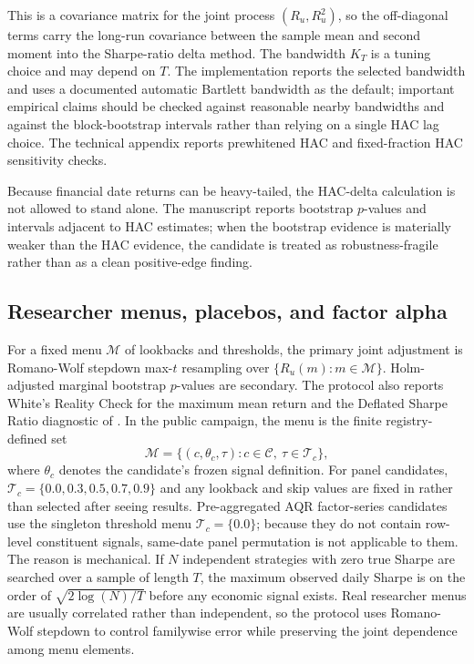 \documentclass[12pt,a4paper]{article}
\begin{document}
This is a covariance matrix for the joint process
\((R_u,R_u^2)\), so the off-diagonal terms carry the
long-run covariance between the sample mean and second moment into the
Sharpe-ratio delta method.
The bandwidth \(K_T\) is a tuning choice and may depend on \(T\).  The
implementation reports the
selected bandwidth and uses a documented automatic Bartlett bandwidth as
the default; important empirical claims should be checked against
reasonable nearby bandwidths and against the block-bootstrap intervals
rather than relying on a single HAC lag choice.
The technical appendix reports prewhitened HAC and fixed-fraction HAC
sensitivity checks.

Because financial date returns can be heavy-tailed, the HAC-delta
calculation is not allowed to stand alone.  The manuscript reports
bootstrap \(p\)-values and intervals adjacent to HAC estimates; when the
bootstrap evidence is materially weaker than the HAC evidence, the
candidate is treated as robustness-fragile rather than as a clean
positive-edge finding.

\subsection{Researcher menus, placebos, and factor alpha}

For a fixed menu \(\mathcal M\) of lookbacks and thresholds, the primary
joint adjustment is Romano-Wolf stepdown max-\(t\) resampling over
\(\{R_u(m):m\in\mathcal M\}\).  Holm-adjusted marginal bootstrap
\(p\)-values are secondary.  The protocol also reports White's Reality Check
for the maximum mean return and the Deflated Sharpe Ratio diagnostic of
\citet{bailey2014probability}.
In the public campaign, the menu is the finite registry-defined set
\[
  \mathcal M=\{(c,\theta_c,\tau):c\in\mathcal C,\ \tau\in\mathcal T_c\},
\]
where \(\theta_c\) denotes the candidate's frozen signal definition.
For panel candidates, \(\mathcal T_c=\{0.0,0.3,0.5,0.7,0.9\}\) and
any lookback and skip values are fixed in 
rather than selected after seeing results.  Pre-aggregated AQR factor-series
candidates use the singleton threshold menu \(\mathcal T_c=\{0.0\}\);
because they do not contain row-level constituent signals, same-date
panel permutation is not applicable to them.
The reason is mechanical.  If \(N\) independent strategies with
zero true Sharpe are searched over a sample of length \(T\), the maximum
observed daily Sharpe is on the order of \(\sqrt{2\log(N)/T}\) before any
economic signal exists.  Real researcher menus are usually correlated
rather than independent, so the protocol uses Romano-Wolf stepdown to
control familywise error while preserving the joint dependence among
menu elements.
\end{document}
